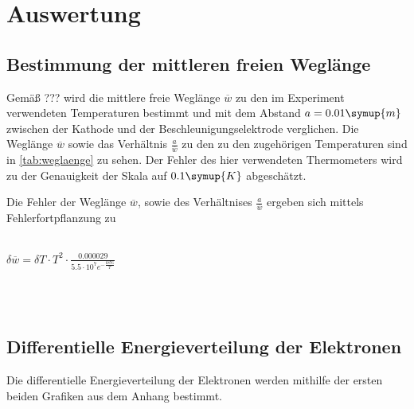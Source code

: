 \section{Auswertung}
\label{sec:Auswertung}
    \subsection{Bestimmung der mittleren freien Weglänge}
    Gemäß ??? wird die mittlere freie Weglänge $\overline{w}$ zu den im Experiment verwendeten Temperaturen bestimmt und mit dem Abstand $a = 0.01 \symup{m}$
    zwischen der Kathode und der Beschleunigungselektrode verglichen. Die Weglänge $\overline{w}$ sowie das Verhältnis $\frac{a}{\overline{w}}$
    zu den zu den zugehörigen Temperaturen sind in \autoref{tab:weglaenge} zu sehen. Der Fehler des hier verwendeten Thermometers wird zu 
    der Genauigkeit der Skala auf $0.1 \symup{K}$ abgeschätzt.
    
    Die Fehler der Weglänge $\overline{w}$, sowie des Verhältnises $\frac{a}{\overline{w}}$ ergeben sich mittels Fehlerfortpflanzung zu
    \\ \\
    \centerline{$\delta \overline{w} = \delta T \cdot T^2 \cdot \frac{0.000029}{5.5 \cdot 10^7 e^{-\frac{6876}{T}}}$}
    \\ \\ %

    \subsection{Differentielle Energieverteilung der Elektronen}
    Die differentielle Energieverteilung der Elektronen werden mithilfe der ersten beiden Grafiken aus dem Anhang bestimmt.
    